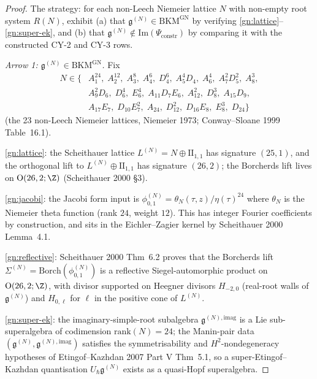 \begin{proof}
The strategy: for each non-Leech Niemeier lattice $N$ with non-empty root system $R(N)$, exhibit (a) that $\mathfrak{g}^{(N)} \in \mathrm{BKM}^{\mathrm{GN}}$ by verifying \ref{gn:lattice}--\ref{gn:super-ek}, and (b) that $\mathfrak{g}^{(N)} \notin \mathrm{Im}(\Psi_{\mathrm{constr}})$ by comparing it with the constructed CY-2 and CY-3 rows.

\emph{Arrow 1: $\mathfrak{g}^{(N)} \in \mathrm{BKM}^{\mathrm{GN}}$.}
Fix
\[
\begin{aligned}
N \in \{&A_1^{24},\; A_2^{12},\; A_3^8,\; A_4^6,\; D_4^6,\; A_5^4 D_4,\; A_6^4,\; A_7^2 D_5^2,\; A_8^3, \\
&A_9^2 D_6,\; D_6^4,\; E_6^4,\; A_{11} D_7 E_6,\; A_{12}^2,\; D_8^3,\; A_{15} D_9, \\
&A_{17} E_7,\; D_{10} E_7^2,\; A_{24},\; D_{12}^2,\; D_{16} E_8,\; E_8^3,\; D_{24}\}
\end{aligned}
\]
(the 23 non-Leech Niemeier lattices, Niemeier 1973; Conway--Sloane 1999 Table~16.1).

\ref{gn:lattice}: the Scheithauer lattice $L^{(N)} = N \oplus \mathrm{II}_{1,1}$ has signature $(25, 1)$, and the orthogonal lift to $L^{(N)} \oplus \mathrm{II}_{1,1}$ has signature $(26, 2)$; the Borcherds lift lives on $\mathrm{O}(26, 2; \Z)$ (Scheithauer 2000 \S3).

\ref{gn:jacobi}: the Jacobi form input is $\phi^{(N)}_{0, 1} = \theta_N(\tau, z) / \eta(\tau)^{24}$ where $\theta_N$ is the Niemeier theta function (rank $24$, weight $12$). This has integer Fourier coefficients by construction, and sits in the Eichler--Zagier kernel by Scheithauer 2000 Lemma~4.1.

\ref{gn:reflective}: Scheithauer 2000 Thm~6.2 proves that the Borcherds lift $\Sigma^{(N)} = \mathrm{Borch}(\phi^{(N)}_{0,1})$ is a reflective Siegel-automorphic product on $\mathrm{O}(26, 2; \Z)$, with divisor supported on Heegner divisors $H_{-2, 0}$ (real-root walls of $\mathfrak{g}^{(N)}$) and $H_{0, \ell}$ for $\ell$ in the positive cone of $L^{(N)}$.

\ref{gn:super-ek}: the imaginary-simple-root subalgebra $\mathfrak{g}^{(N), \mathrm{imag}}$ is a Lie sub-superalgebra of codimension $\mathrm{rank}(N) = 24$; the Manin-pair data $(\mathfrak{g}^{(N)}, \mathfrak{g}^{(N), \mathrm{imag}})$ satisfies the symmetrisability and $H^2$-nondegeneracy hypotheses of Etingof--Kazhdan 2007 Part V Thm~5.1, so a super-Etingof--Kazhdan quantisation $U_\hbar \mathfrak{g}^{(N)}$ exists as a quasi-Hopf superalgebra.


\end{proof}
